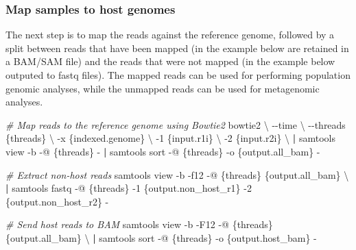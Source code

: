 \documentclass[
]{book}
\newenvironment{Shaded}{\begin{snugshade}}{\end{snugshade}}
\newcommand{\AttributeTok}[1]{\textcolor[rgb]{0.77,0.63,0.00}{#1}}
\newcommand{\CommentTok}[1]{\textcolor[rgb]{0.56,0.35,0.01}{\textit{#1}}}
\newcommand{\DataTypeTok}[1]{\textcolor[rgb]{0.13,0.29,0.53}{#1}}
\newcommand{\ExtensionTok}[1]{#1}
\newcommand{\KeywordTok}[1]{\textcolor[rgb]{0.13,0.29,0.53}{\textbf{#1}}}
\newcommand{\NormalTok}[1]{#1}
\begin{document}
\normalsize

\hypertarget{map-samples-to-host-genomes}{%
\subsubsection*{Map samples to host genomes}\label{map-samples-to-host-genomes}}

The next step is to map the reads against the reference genome, followed by a split between reads that have been mapped (in the example below are retained in a BAM/SAM file) and the reads that were not mapped (in the example below outputed to fastq files). The mapped reads can be used for performing population genomic analyses, while the unmapped reads can be used for metagenomic analyses.

\small

\begin{Shaded}
\begin{Highlighting}[]
\CommentTok{\# Map reads to the reference genome using Bowtie2}
\ExtensionTok{bowtie2} \DataTypeTok{\textbackslash{}}
    \AttributeTok{{-}{-}time} \DataTypeTok{\textbackslash{}}
    \AttributeTok{{-}{-}threads}\NormalTok{ \{threads\} }\DataTypeTok{\textbackslash{}}
    \AttributeTok{{-}x}\NormalTok{ \{indexed.genome\} }\DataTypeTok{\textbackslash{}}
    \AttributeTok{{-}1}\NormalTok{ \{input.r1i\} }\DataTypeTok{\textbackslash{}}
    \AttributeTok{{-}2}\NormalTok{ \{input.r2i\} }\DataTypeTok{\textbackslash{}}
\KeywordTok{|} \ExtensionTok{samtools}\NormalTok{ view }\AttributeTok{{-}b} \AttributeTok{{-}@}\NormalTok{ \{threads\} }\AttributeTok{{-}} \KeywordTok{|} \ExtensionTok{samtools}\NormalTok{ sort }\AttributeTok{{-}@}\NormalTok{ \{threads\} }\AttributeTok{{-}o}\NormalTok{ \{output.all\_bam\} }\AttributeTok{{-}}

\CommentTok{\# Extract non{-}host reads}
\ExtensionTok{samtools}\NormalTok{ view }\AttributeTok{{-}b} \AttributeTok{{-}f12} \AttributeTok{{-}@}\NormalTok{ \{threads\} \{output.all\_bam\} }\DataTypeTok{\textbackslash{}}
\KeywordTok{|} \ExtensionTok{samtools}\NormalTok{ fastq }\AttributeTok{{-}@}\NormalTok{ \{threads\} }\AttributeTok{{-}1}\NormalTok{ \{output.non\_host\_r1\} }\AttributeTok{{-}2}\NormalTok{ \{output.non\_host\_r2\} }\AttributeTok{{-}}

\CommentTok{\# Send host reads to BAM}
\ExtensionTok{samtools}\NormalTok{ view }\AttributeTok{{-}b} \AttributeTok{{-}F12} \AttributeTok{{-}@}\NormalTok{ \{threads\} \{output.all\_bam\} }\DataTypeTok{\textbackslash{}}
\KeywordTok{|} \ExtensionTok{samtools}\NormalTok{ sort }\AttributeTok{{-}@}\NormalTok{ \{threads\} }\AttributeTok{{-}o}\NormalTok{ \{output.host\_bam\} }\AttributeTok{{-}}
\end{Highlighting}
\end{Shaded}
\end{document}
